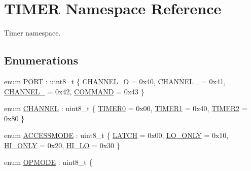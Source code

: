 \hypertarget{namespace_t_i_m_e_r}{}\section{T\+I\+M\+ER Namespace Reference}
\label{namespace_t_i_m_e_r}


Timer namespace.  


\subsection*{Enumerations}
\begin{DoxyCompactItemize}
\item 
enum \hyperlink{namespace_t_i_m_e_r_a5043f8b0fa08d522d4f832be598a3fdf}{P\+O\+RT} \+: uint8\+\_\+t \{ \hyperlink{namespace_t_i_m_e_r_a5043f8b0fa08d522d4f832be598a3fdfab7ce47e0ce8d46296ecd6b41bf251491}{C\+H\+A\+N\+N\+E\+L\+\_\+O} = 0x40, 
\hyperlink{namespace_t_i_m_e_r_a5043f8b0fa08d522d4f832be598a3fdfadb3a5668285fe889fe0ee3a218363062}{C\+H\+A\+N\+N\+E\+L\+\_} = 0x41, 
\hyperlink{namespace_t_i_m_e_r_a5043f8b0fa08d522d4f832be598a3fdfaf0105f11af5f1315ae04c465d6494ace}{C\+H\+A\+N\+N\+E\+L\+\_} = 0x42, 
\hyperlink{namespace_t_i_m_e_r_a5043f8b0fa08d522d4f832be598a3fdfa6f37465e170733ddbd788045f37c7c0e}{C\+O\+M\+M\+A\+ND} = 0x43
 \}
\item 
enum \hyperlink{namespace_t_i_m_e_r_aa8e1446270d3ec25bd994c07619b8f37}{C\+H\+A\+N\+N\+EL} \+: uint8\+\_\+t \{ \hyperlink{namespace_t_i_m_e_r_aa8e1446270d3ec25bd994c07619b8f37ac083cdc3929c64cf4cdce930854093ac}{T\+I\+M\+E\+R0} = 0x00, 
\hyperlink{namespace_t_i_m_e_r_aa8e1446270d3ec25bd994c07619b8f37adf6d731a40369a9f5fc1277f082eb967}{T\+I\+M\+E\+R1} = 0x40, 
\hyperlink{namespace_t_i_m_e_r_aa8e1446270d3ec25bd994c07619b8f37a9abd15e0c5e5c738cccdf17132a28bdc}{T\+I\+M\+E\+R2} = 0x80
 \}
\item 
enum \hyperlink{namespace_t_i_m_e_r_af9ea977bf574cbb806bde5e36476f5d0}{A\+C\+C\+E\+S\+S\+M\+O\+DE} \+: uint8\+\_\+t \{ \hyperlink{namespace_t_i_m_e_r_af9ea977bf574cbb806bde5e36476f5d0acc5e7218f9e4ebeb4de9c08b2464df5f}{L\+A\+T\+CH} = 0x00, 
\hyperlink{namespace_t_i_m_e_r_af9ea977bf574cbb806bde5e36476f5d0a6e277afa7b41a9bc968bc51cbecce7f2}{L\+O\+\_\+\+O\+N\+LY} = 0x10, 
\hyperlink{namespace_t_i_m_e_r_af9ea977bf574cbb806bde5e36476f5d0af22178da96e1972db792132dc192d7df}{H\+I\+\_\+\+O\+N\+LY} = 0x20, 
\hyperlink{namespace_t_i_m_e_r_af9ea977bf574cbb806bde5e36476f5d0ac43a6e8b2707c4ff404d01b72f0affb7}{H\+I\+\_\+\+LO} = 0x30
 \}
\item 
enum \hyperlink{namespace_t_i_m_e_r_a3231391ecc5f5895452fcc54c5fabe26}{O\+P\+M\+O\+DE} \+: uint8\+\_\+t \{ \newline

\end{DoxyCompactItemize}
